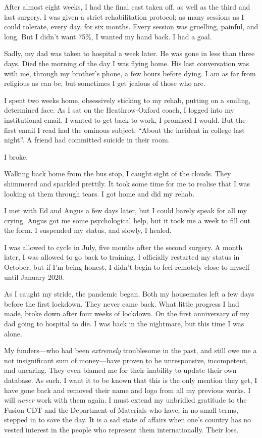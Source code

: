 After almost eight weeks, I had the final cast taken off, as well as the third and last surgery. I was given a strict rehabilitation protocol; as many sessions as I could tolerate, every day, for six months. Every session was gruelling, painful, and long. But I didn't want 75\%, I wanted my hand back. I had a goal.

Sadly, my dad was taken to hospital a week later. He was gone in less than three days. Died the morning of the day I was flying home. His last conversation was with me, through my brother's phone, a few hours before dying. I am as far from religious as can be, but sometimes I get jealous of those who are.

I spent two weeks home, obsessively sticking to my rehab, putting on a smiling, determined face. As I sat on the Heathrow-Oxford coach, I logged into my institutional email. I wanted to get back to work, I promised I would. But the first email I read had the ominous subject, ``About the incident in college last night''. A friend had committed suicide in their room.

I broke.

Walking back home from the bus stop, I caught sight of the clouds. They shimmered and sparkled prettily. It took some time for me to realise that I was looking at them through tears. I got home and did my rehab.

I met with Ed and Angus a few days later, but I could barely speak for all my crying. Angus got me some psychological help, but it took me a week to fill out the form. I suspended my status, and slowly, I healed.

I was allowed to cycle in July, five months after the second surgery. A month later, I was allowed to go back to training. I officially restarted my status in October, but if I'm being honest, I didn't begin to feel remotely close to myself until January 2020.

As I caught my stride, the pandemic began. Both my housemates left a few days before the first lockdown. They never came back. What little progress I had made, broke down after four weeks of lockdown. On the first anniversary of my dad going to hospital to die. I was back in the nightmare, but this time I was alone.

My funders---who had been \emph{extremely} troublesome in the past, and still owe me a not insignificant sum of money---have proven to be unresponsive, incompetent, and uncaring. They even blamed me for their inability to update their own database. As such, I want it to be known that this is the only mention they get, I have gone back and removed their name and logo from all my previous works. I will \emph{never} work with them again. I must extend my unbridled gratitude to the Fusion CDT and the Department of Materials who have, in no small terms, stepped in to save the day. It is a sad state of affairs when one's country has no vested interest in the people who represent them internationally. Their loss.

